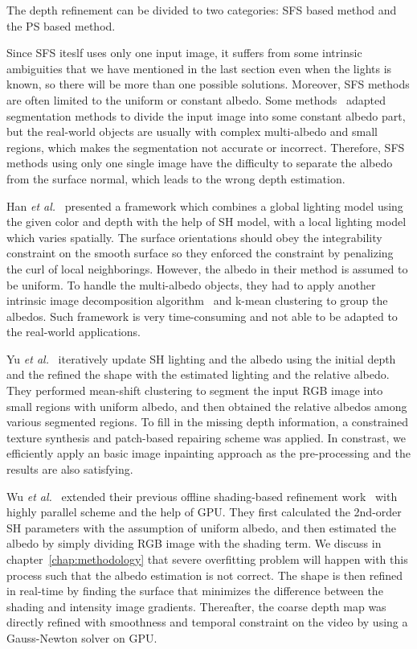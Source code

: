 The depth refinement can be divided to two categories: SFS based method and the PS based method.

Since SFS iteslf uses only one input image, it suffers from some intrinsic ambiguities that we have mentioned in the last section even when the lights is known, so there will be more than one possible solutions.
Moreover, SFS methods are often limited to the uniform or constant albedo. 
Some methods~\cite{han2013high, yu2013shading} adapted segmentation methods to divide the input image into some constant albedo part, but the real-world objects are usually with complex multi-albedo and small regions, which makes the segmentation not accurate or incorrect.  
Therefore, SFS methods using only one single image have the difficulty to separate the albedo from the surface normal, which leads to the wrong depth estimation.

Han \emph{et al.}~\cite{han2013high} presented a framework which combines a global lighting model using the given color and depth with the help of SH model, with a local lighting model which varies spatially. 
The surface orientations should obey the integrability constraint on the smooth surface so they enforced the constraint by penalizing the curl of local neighborings.
However, the albedo in their method is assumed to be uniform.
To handle the multi-albedo objects, they had to apply another intrinsic image decomposition algorithm~\cite{barron2011high} and k-mean clustering to group the albedos.
Such framework is very time-consuming and not able to be adapted to the real-world applications.

Yu \emph{et al.}~\cite{yu2013shading} iteratively update SH lighting and the albedo using the initial depth and the refined the shape with the estimated lighting and the relative albedo. 
They performed mean-shift clustering to segment the input RGB image into small regions with uniform albedo, and then obtained the relative albedos among various segmented regions. 
To fill in the missing depth information, a constrained texture synthesis and patch-based repairing scheme was applied.
In constrast, we efficiently apply an basic image inpainting approach as the pre-processing and the results are also satisfying.


Wu \emph{et al.}~\cite{wu2014real} extended their previous offline shading-based refinement work~\cite{wu2011shading} with highly parallel scheme and the help of GPU. 
They first calculated the 2nd-order SH parameters with the assumption of uniform albedo, and then estimated the albedo by simply dividing RGB image with the shading term.
We discuss in chapter~\ref{chap:methodology} that severe overfitting problem will happen with this process such that the albedo estimation is not correct.
The shape is then refined in real-time by finding the surface that minimizes the difference between the shading and intensity image gradients.
Thereafter, the coarse depth map was directly refined with smoothness and temporal constraint on the video by using a Gauss-Newton solver on GPU.

